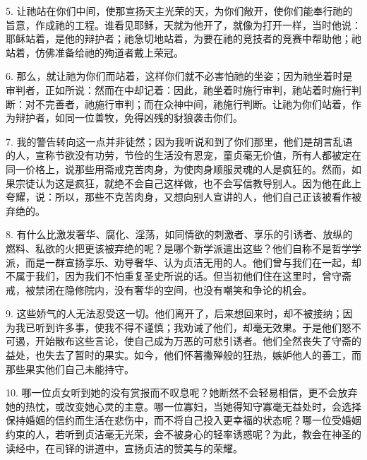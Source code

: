 5. 让祂站在你们中间，使那宣扬天主光荣的天，为你们敞开，使你们能奉行祂的旨意，作成祂的工程。谁看见耶稣，天就为他开了，就像为打开一样，当时他说：耶稣站着，是他的辩护者；祂急切地站着，为要在祂的竞技者的竞赛中帮助他；祂站着，仿佛准备给祂的殉道者戴上荣冠。\par

6. 那么，就让祂为你们而站着，这样你们就不必害怕祂的坐姿；因为祂坐着时是审判者，正如所说：然而在中却记着：因此，祂坐着时施行审判，祂站着时施行判断：对不完善者，祂施行审判；而在众神中间，祂施行判断。让祂为你们站着，作为辩护者，如同一位善牧，免得凶残的豺狼袭击你们。\par

7. 我的警告转向这一点并非徒然；因为我听说和到了你们那里，他们是胡言乱语的人，宣称节欲没有功劳，节俭的生活没有恩宠，童贞毫无价值，所有人都被定在同一价格上，说那些用斋戒克苦肉身，为使肉身顺服灵魂的人是疯狂的。然而，如果宗徒认为这是疯狂，就绝不会自己这样做，也不会写信教导别人。因为他在此上夸耀，说：所以，那些不克苦肉身，又想向别人宣讲的人，他们自己正该被看作被弃绝的。\par

8. 有什么比激发奢华、腐化、淫荡，如同情欲的刺激者、享乐的引诱者、放纵的燃料、私欲的火把更该被弃绝的呢？是哪个新学派遣出这些？他们自称不是哲学学派，而是一群宣扬享乐、劝导奢华、认为贞洁无用的人。他们曾与我们在一起，却不属于我们，因为我们不怕重复圣史所说的话。但当初他们住在这里时，曾守斋戒，被禁闭在隐修院内，没有奢华的空间，也没有嘲笑和争论的机会。\par

9. 这些娇气的人无法忍受这一切。他们离开了，后来想回来时，却不被接纳；因为我已听到许多事，使我不得不谨慎；我劝诫了他们，却毫无效果。于是他们怒不可遏，开始散布这些言论，使自己成为万恶的可悲引诱者。他们全然丧失了守斋的益处，也失去了暂时的果实。如今，他们怀著撒殚般的狂热，嫉妒他人的善工，而那些果实他们自己未能持守。\par

10. 哪一位贞女听到她的没有赏报而不叹息呢？她断然不会轻易相信，更不会放弃她的热忱，或改变她心灵的主意。哪一位寡妇，当她得知守寡毫无益处时，会选择保持婚姻的信约而生活在悲伤中，而不将自己投入更幸福的状态呢？哪一位受婚姻约束的人，若听到贞洁毫无光荣，会不被身心的轻率诱惑呢？为此，教会在神圣的读经中，在司铎的讲道中，宣扬贞洁的赞美与的荣耀。\par

